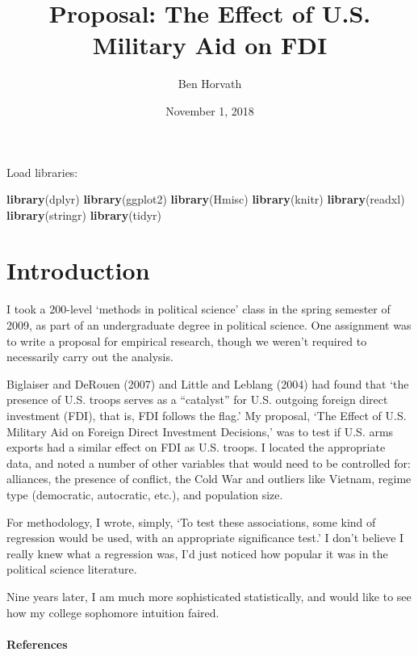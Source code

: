 \documentclass[12pt,]{article}
\title{Proposal: The Effect of U.S. Military Aid on FDI}
\author{Ben Horvath}
\date{November 1, 2018}
\newenvironment{Shaded}{\begin{snugshade}}{\end{snugshade}}
\newcommand{\KeywordTok}[1]{\textcolor[rgb]{0.13,0.29,0.53}{\textbf{#1}}}
\newcommand{\NormalTok}[1]{#1}
\let\oldparagraph\paragraph
\renewcommand{\paragraph}[1]{\oldparagraph{#1}\mbox{}}
\begin{document}
\maketitle

Load libraries:

\begin{Shaded}
\begin{Highlighting}[]
\KeywordTok{library}\NormalTok{(dplyr)}
\KeywordTok{library}\NormalTok{(ggplot2)}
\KeywordTok{library}\NormalTok{(Hmisc)}
\KeywordTok{library}\NormalTok{(knitr)}
\KeywordTok{library}\NormalTok{(readxl)}
\KeywordTok{library}\NormalTok{(stringr)}
\KeywordTok{library}\NormalTok{(tidyr)}
\end{Highlighting}
\end{Shaded}

\hypertarget{introduction}{%
\section{Introduction}\label{introduction}}

I took a 200-level `methods in political science' class in the spring
semester of 2009, as part of an undergraduate degree in political
science. One assignment was to write a proposal for empirical research,
though we weren't required to necessarily carry out the analysis.

Biglaiser and DeRouen (2007) and Little and Leblang (2004) had found
that `the presence of U.S. troops serves as a ``catalyst'' for U.S.
outgoing foreign direct investment (FDI), that is, FDI follows the
flag.' My proposal, `The Effect of U.S. Military Aid on Foreign Direct
Investment Decisions,' was to test if U.S. arms exports had a similar
effect on FDI as U.S. troops. I located the appropriate data, and noted
a number of other variables that would need to be controlled for:
alliances, the presence of conflict, the Cold War and outliers like
Vietnam, regime type (democratic, autocratic, etc.), and population
size.

For methodology, I wrote, simply, `To test these associations, some kind
of regression would be used, with an appropriate significance test.' I
don't believe I really knew what a regression was, I'd just noticed how
popular it was in the political science literature.

Nine years later, I am much more sophisticated statistically, and would
like to see how my college sophomore intuition faired.

\hypertarget{references}{%
\paragraph{References}\label{references}}
\end{document}
